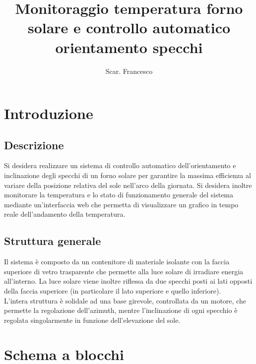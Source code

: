 \documentclass[12pt]{article}
\title{\textbf{Monitoraggio temperatura forno solare e controllo automatico orientamento specchi}}
\author{Scar. Francesco}
\date{}
\begin{document}
\maketitle

\tableofcontents{}

\newpage



\section{Introduzione}
    \subsection{Descrizione}
    Si desidera realizzare un sistema di controllo automatico dell'orientamento e inclinazione degli specchi di un forno solare per garantire la massima efficienza al variare della posizione relativa del sole nell'arco della giornata.
    Si desidera inoltre monitorare la temperatura e lo stato di funzionamento generale del sistema mediante un'interfaccia web che permetta di visualizzare un grafico in tempo reale dell'andamento della temperatura.


    \subsection{Struttura generale}
    Il sistema è composto da un contenitore di materiale isolante con la faccia superiore di vetro trasparente che permette alla luce solare di irradiare energia all'interno. La luce solare viene inoltre riflessa da due specchi posti ai lati opposti della faccia superiore (in particolare il lato superiore e quello inferiore).\\
    L'intera struttura è solidale ad una base girevole, controllata da un motore, che permette la regolazione dell'azimuth, mentre l'inclinazione di ogni specchio è regolata singolarmente in funzione dell'elevazione del sole.
    
\section{Schema a blocchi}
\end{document}
